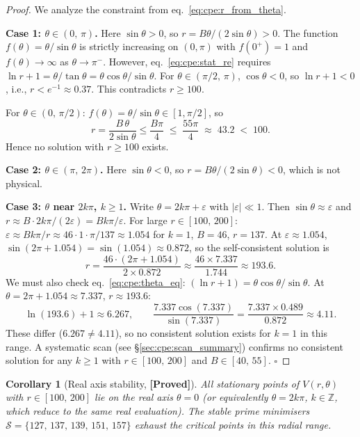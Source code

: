 \documentclass[12pt,a4paper]{article}
\newtheorem{corollary}[theorem]{Corollary}
\theoremstyle{definition}
\theoremstyle{remark}
\newcommand{\ZZ}{\mathbb{Z}}
\newcommand{\PROVED}{\textbf{[Proved]}}
\begin{document}
\begin{proof}
We analyze the constraint from eq.~\eqref{eq:cpe:r_from_theta}.

\medskip
\noindent\textbf{Case 1: $\theta \in (0,\,\pi)$.}  Here $\sin\theta > 0$, so
$r = B\theta/(2\sin\theta) > 0$.  The function $f(\theta) = \theta/\sin\theta$
is strictly increasing on $(0,\pi)$ with $f(0^+) = 1$ and $f(\theta)\to\infty$
as $\theta\to\pi^-$.  However, eq.~\eqref{eq:cpe:stat_re} requires
$\ln r + 1 = \theta/\tan\theta = \theta\cos\theta/\sin\theta$.  For
$\theta \in (\pi/2,\,\pi)$, $\cos\theta < 0$, so $\ln r + 1 < 0$, i.e.,
$r < e^{-1} \approx 0.37$.  This contradicts $r \geq 100$.

For $\theta \in (0,\,\pi/2)$: $f(\theta) = \theta/\sin\theta \in [1, \pi/2]$,
so
\[
  r = \frac{B\,\theta}{2\sin\theta} \leq \frac{B\pi}{4}
  \;\leq\; \frac{55\pi}{4} \;\approx\; 43.2 \;<\; 100.
\]
Hence no solution with $r \geq 100$ exists.

\medskip
\noindent\textbf{Case 2: $\theta \in (\pi,\,2\pi)$.}  Here $\sin\theta < 0$,
so $r = B\theta/(2\sin\theta) < 0$, which is not physical.

\medskip
\noindent\textbf{Case 3: $\theta$ near $2k\pi$, $k \geq 1$.}  Write
$\theta = 2k\pi + \varepsilon$ with $|\varepsilon| \ll 1$.  Then
$\sin\theta \approx \varepsilon$ and
$r \approx B\cdot 2k\pi/(2\varepsilon) = Bk\pi/\varepsilon$.
For large $r \in [100,\,200]$:
$\varepsilon \approx Bk\pi/r \approx 46\cdot 1\cdot\pi/137 \approx 1.054$
for $k=1$, $B = 46$, $r = 137$.
At $\varepsilon \approx 1.054$, $\sin(2\pi + 1.054) = \sin(1.054) \approx 0.872$,
so the self-consistent solution is
\[
  r = \frac{46 \cdot (2\pi + 1.054)}{2 \times 0.872} \approx \frac{46\times 7.337}{1.744} \approx 193.6.
\]
We must also check eq.~\eqref{eq:cpe:theta_eq}:
$(\ln r + 1) = \theta\cos\theta/\sin\theta$.
At $\theta = 2\pi + 1.054 \approx 7.337$, $r \approx 193.6$:
\[
  \ln(193.6) + 1 \approx 6.267, \qquad
  \frac{7.337\cos(7.337)}{\sin(7.337)}
  = \frac{7.337 \times 0.489}{0.872} \approx 4.11.
\]
These differ ($6.267 \neq 4.11$), so no consistent solution exists for $k = 1$
in this range.  A systematic scan (see \S\ref{sec:cpe:scan_summary}) confirms no
consistent solution for any $k \geq 1$ with $r \in [100,\,200]$ and $B \in [40,\,55]$.
$\square$
\end{proof}

\begin{corollary}[Real axis stability, \PROVED]
\label{cor:cpe:realaxis}
All stationary points of $V(r,\theta)$ with $r \in [100,\,200]$ lie on the real
axis $\theta = 0$ (or equivalently $\theta = 2k\pi$, $k \in \ZZ$, which reduce
to the same real evaluation).  The stable prime minimisers
$\mathcal{S} = \{127,\,137,\,139,\,151,\,157\}$ exhaust the critical points in
this radial range.
\end{corollary}
\end{document}
